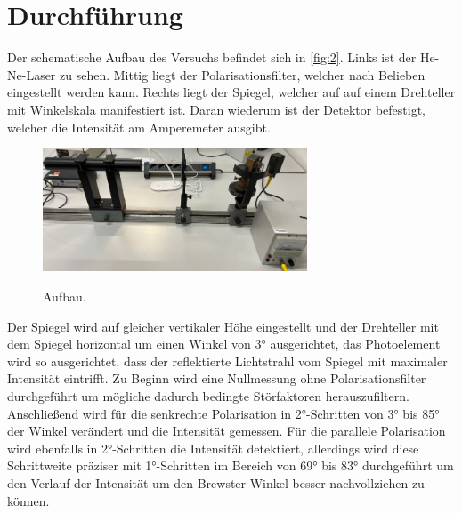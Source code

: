 \section{Durchführung}
\label{sec:Durchführung}

Der schematische Aufbau des Versuchs befindet sich in \autoref{fig:2}. Links 
ist der He-Ne-Laser zu sehen. Mittig liegt der Polarisationsfilter, welcher
nach Belieben eingestellt werden kann. Rechts liegt der Spiegel, welcher auf
auf einem Drehteller mit Winkelskala manifestiert ist. Daran wiederum ist der 
Detektor befestigt, welcher die Intensität am Amperemeter ausgibt.
\begin{figure}[H]
    \caption{Aufbau.}
    \centering
    \includegraphics[width=0.7\textwidth]{"Bilder/aufbau.jpg"}
    \label{fig:2}
\end{figure}
\noindent Der Spiegel wird auf gleicher vertikaler Höhe eingestellt und der Drehteller 
mit dem Spiegel horizontal um einen Winkel von 3° ausgerichtet, das Photoelement 
wird so ausgerichtet, dass der reflektierte Lichtstrahl vom Spiegel mit 
maximaler Intensität eintrifft.
Zu Beginn wird eine Nullmessung ohne Polarisationsfilter durchgeführt um
mögliche dadurch bedingte Störfaktoren herauszufiltern. Anschließend wird 
für die senkrechte Polarisation in 2°-Schritten von 3° bis 85° der Winkel
verändert und die Intensität gemessen. Für die parallele Polarisation wird 
ebenfalls in 2°-Schritten die Intensität detektiert, allerdings wird diese 
Schrittweite präziser mit 1°-Schritten im Bereich von 69° bis 83° durchgeführt 
um den Verlauf der Intensität um den Brewster-Winkel besser nachvollziehen zu 
können.